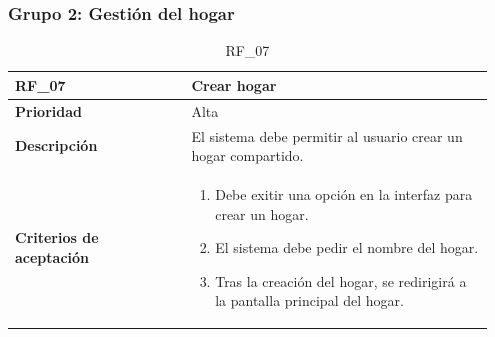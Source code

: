 \clearpage

\subsubsection{Grupo 2: Gestión del hogar}
\label{subsubsec:grupo2}

\begin{table}[htb!]
    \begin{tabular}{|p{0.35\linewidth}|p{0.6\linewidth}|}
        \hline
        \rowcolor[HTML]{C0C0C0}  
        \textbf{RF\_07} & \textbf{Crear hogar} \\
        \hline
        \textbf{Prioridad} & Alta \\
        \hline
        \textbf{Descripción} & El sistema debe permitir al usuario crear un hogar compartido.  \\
        \hline
        \vspace{0.5mm}
        \textbf{Criterios de aceptación} & 
        \begin{minipage}[t]{0.9\linewidth}
            \begin{enumerate}
                \item Debe exitir una opción en la interfaz para crear un hogar.
                \item El sistema debe pedir el nombre del hogar.
                \item Tras la creación del hogar, se redirigirá a la pantalla principal del hogar.
            \end{enumerate}
            \vspace{2mm}
        \end{minipage} \\
        \hline
    \end{tabular}
    \caption{RF\_07}
    \label{req:RF07}

\end{table}


